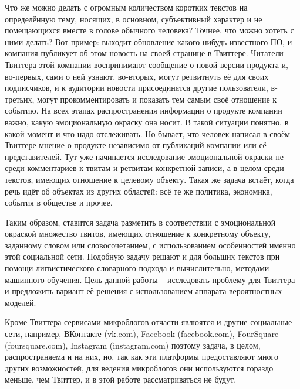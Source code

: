 Что же можно делать с огромным количеством коротких текстов на определённую
тему, носящих, в основном, субъективный характер и не помещающихся вместе
в голове обычного человека? Точнее, что можно хотеть с ними делать? Вот пример:
выходит обновление какого-нибудь известного ПО, и компания публикует об этом
новость на своей странице в Твиттере. Читатели Твиттера этой компании воспринимают
сообщение о новой версии продукта и, во-первых, сами о ней узнают, во-вторых,
могут ретвитнуть её для своих подписчиков, и к аудитории новости присоединятся другие пользователи,
в-третьих, могут прокомментировать и показать тем самым своё отношение к событию.
На всех этапах распространения информации о продукте компании важно, какую
эмоциональную окраску она носит. В такой ситуации понятно, в какой момент и что
надо отслеживать. Но бывает, что человек написал в своём Твиттере мнение о
продукте независимо от публикаций компании или её представителей. Тут уже
начинается исследование эмоциональной окраски не среди комментариев к твитам и
ретвитам конкретной записи, а в целом среди текстов, имеющих отношение к целевому
объекту. Такая же задача встаёт, когда речь идёт об объектах из других областей:
всё те же политика, экономика, события в обществе и прочее.

Таким образом, ставится задача разметить в соответствии с эмоциональной окраской
множество твитов, имеющих отношение к конкретному объекту, заданному словом или
словосочетанием, с использованием особенностей именно этой социальной сети. Подобную
задачу решают и для больших текстов при помощи лигвистического словарного подхода и
вычислительно, методами машинного обучения. Цель данной работы --
исследовать проблему для Твиттера и предложить вариант её решения с использованием
аппарата вероятностных моделей.

Кроме Твиттера сервисами микроблогов отчасти явлюятся и другие социальные сети, например,
ВКонтакте (vk.com), Facebook (facebook.com), FourSquare (foursquare.com),
Instagram (instagram.com) поэтому задача, в целом, распространяема и на них,
но, так как эти платформы предоставляют много других возможностей, для ведения
микроблогов они используются гораздо меньше, чем Твиттер, и в этой работе
рассматриваться не будут.
